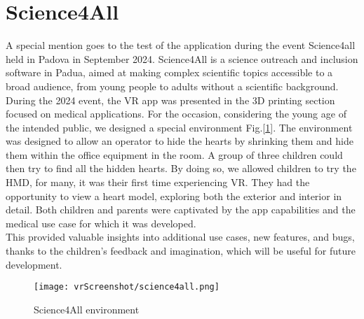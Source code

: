 \section{Science4All}
\noindent
A special mention goes to the test of the application during the event Science4all held in Padova in September 2024.
Science4All is a science outreach and inclusion software in Padua, aimed at making complex scientific topics accessible to a broad audience,
from young people to adults without a scientific background.\\
During the 2024 event, the \ac{VR} app was presented in the 3D printing section focused on medical applications.
For the occasion, considering the young age of the intended public, we designed a special environment Fig.[\ref{fig:science4all}].
The environment was designed to allow an operator to hide the hearts by shrinking them and hide them within the office equipment in the room. A group of three children could then try to find all the hidden hearts.
By doing so, we allowed children to try the \ac{HMD}, for many, it was their first time experiencing \ac{VR}. They had the opportunity to view a heart model, exploring both the exterior and interior in detail.
Both children and parents were captivated by the app capabilities and the medical use case for which it was developed.\\
This provided valuable insights into additional use cases, new features, and bugs, thanks to the children's feedback and imagination, which will be useful for future development.


\begin{figure}[hb]
  \centering
  \texttt{[image: vrScreenshot/science4all.png]}
  \caption{Science4All environment}
  \label{fig:science4all}
\end{figure}